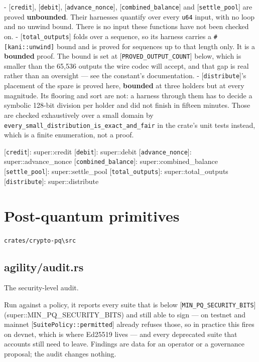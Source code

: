 \documentclass[11pt,a4paper]{article}
\begin{document}
- [\texttt{credit}], [\texttt{debit}], [\texttt{advance\_nonce}], [\texttt{combined\_balance}] and
  [\texttt{settle\_pool}] are proved \textbf{unbounded}. Their harnesses quantify over
  every \texttt{u64} input, with no loop and no unwind bound. There is no input
  these functions have not been checked on.
- [\texttt{total\_outputs}] folds over a sequence, so its harness carries a
  \texttt{\#[kani::unwind]} bound and is proved for sequences up to that length
  only. It is a \textbf{bounded} proof. The bound is set at
  [\texttt{PROVED\_OUTPUT\_COUNT}] below, which is smaller than the 65,536 outputs the
  wire codec will accept, and that gap is real rather than an oversight —
  see the constant's documentation.
- [\texttt{distribute}]'s placement of the spare is proved here, \textbf{bounded} at
  three holders but at every magnitude. Its flooring and sort are not: a
  harness through them has to decide a symbolic 128-bit division per holder
  and did not finish in fifteen minutes. Those are checked exhaustively over
  a small domain by \texttt{every\_small\_distribution\_is\_exact\_and\_fair} in the
  crate's unit tests instead, which is a finite enumeration, not a proof.

[\texttt{credit}]: super::credit
[\texttt{debit}]: super::debit
[\texttt{advance\_nonce}]: super::advance\_nonce
[\texttt{combined\_balance}]: super::combined\_balance
[\texttt{settle\_pool}]: super::settle\_pool
[\texttt{total\_outputs}]: super::total\_outputs
[\texttt{distribute}]: super::distribute

\section{Post-quantum primitives}
\noindent\texttt{crates/crypto-pq\textbackslash{}src}

\subsection{agility/audit.rs}
The security-level audit.

Run against a policy, it reports every suite that is below
[\texttt{MIN\_PQ\_SECURITY\_BITS}](super::MIN\_PQ\_SECURITY\_BITS) and still able to
sign — on testnet and mainnet [\texttt{SuitePolicy::permitted}] already refuses
those, so in practice this fires on devnet, which is where Ed25519 lives —
and every deprecated suite that accounts still need to leave. Findings are
data for an operator or a governance proposal; the audit changes nothing.
\end{document}
